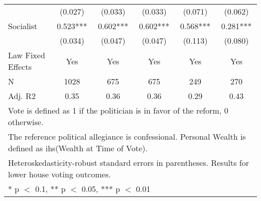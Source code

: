 \begin{table}[!h]
{\begin{tabular}[t]{lccccc}
 & (\num{0.027}) & (\num{0.033}) & (\num{0.033}) & (\num{0.071}) & (\num{0.062})\\
Socialist & \num{0.523}*** & \num{0.602}*** & \num{0.602}*** & \num{0.568}*** & \num{0.281}***\\
 & (\num{0.034}) & (\num{0.047}) & (\num{0.047}) & (\num{0.113}) & (\num{0.080})\\
\midrule
Law Fixed Effects & Yes & Yes & Yes & Yes & Yes\\
N & \num{1028} & \num{675} & \num{675} & \num{249} & \num{270}\\
Adj. R2 & \num{0.35} & \num{0.36} & \num{0.36} & \num{0.29} & \num{0.43}\\
\bottomrule
\multicolumn{6}{l}{\rule{0pt}{1em}Vote is defined as 1 if the politician is in favor of the reform, 0 otherwise.}\\
\multicolumn{6}{l}{\rule{0pt}{1em}The reference political allegiance is confessional. Personal Wealth is defined as ihs(Wealth at Time of Vote).}\\
\multicolumn{6}{l}{\rule{0pt}{1em}Heteroskedasticity-robust standard errors in parentheses. Results for lower house voting outcomes.}\\
\multicolumn{6}{l}{\rule{0pt}{1em}* p $<$ 0.1, ** p $<$ 0.05, *** p $<$ 0.01}\\
\end{tabular}}
\end{table}